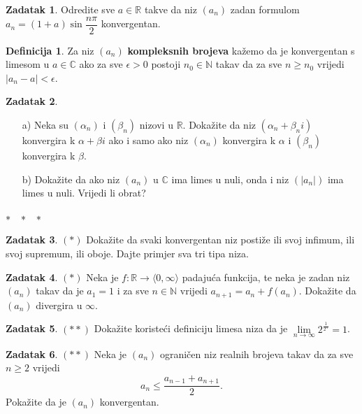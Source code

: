 \documentclass{book}
\theoremstyle{definition}
\theoremstyle{definition}
\newtheorem{definition}{Definicija}
\newtheorem{exercise}{Zadatak}
\theoremstyle{remark}
\begin{document}
\begin{exercise}
Odredite sve $a\in \mathbb{R}$ takve da niz $(a_n)$ zadan formulom $a_n=(1+a)\sin{\dfrac{n\pi}{2}}$ konvergentan.
\end{exercise}

\begin{definition}
Za niz $(a_n)$ \textbf{kompleksnih brojeva} kažemo da je konvergentan s limesom u $a\in \mathbb{C}$ ako za sve $\epsilon>0$ postoji $n_0\in \mathbb{N}$ takav da za sve $n\geq n_0$ vrijedi $|a_n-a|<\epsilon$.
\end{definition}

\begin{exercise} \textbf{}
\begin{itemize}
\item[a)] Neka su $(\alpha_n)$ i $(\beta_n)$ nizovi u $\mathbb{R}$. Dokažite da niz $(\alpha_n+\beta_n i)$ konvergira k $\alpha+\beta i$ ako i samo ako niz $(\alpha_n)$ konvergira k $\alpha$ i $(\beta_n)$ konvergira k $\beta$.
\item[b)] Dokažite da ako niz $(a_n)$ u $\mathbb{C}$ ima limes u nuli, onda i niz $(|a_n|)$ ima limes u nuli. Vrijedi li obrat?
\end{itemize}
\end{exercise}
\begin{center}
$*\hspace{0.3cm}*\hspace{0.3cm}*\hspace{0.3cm}$
\end{center}
\begin{exercise} $(*)$
Dokažite da svaki konvergentan niz postiže ili svoj infimum, ili svoj supremum, ili oboje. Dajte primjer sva tri tipa niza.
\end{exercise}
\begin{exercise} $(*)$
Neka je $f : \mathbb{R}\to \langle 0, \infty\rangle$ padajuća funkcija, te neka je zadan niz $(a_n)$ takav da je $a_1=1$ i za sve $n\in \mathbb{N}$ vrijedi $a_{n+1}=a_n+f(a_n)$. Dokažite da $(a_n)$ divergira u $\infty$.
\end{exercise}
\begin{exercise} $(**)$
Dokažite koristeći definiciju limesa niza da je $\lim\limits_{n\to \infty}{2^{\frac{1}{2^n}}}=1$.
\end{exercise}
\begin{exercise} $(**)$
Neka je $(a_n)$ ograničen niz realnih brojeva takav da za sve $n\geq 2$ vrijedi
$$a_n\leq \dfrac{a_{n-1}+a_{n+1}}{2}.$$
Pokažite da je $(a_n)$ konvergentan.
\end{exercise}
\end{document}
